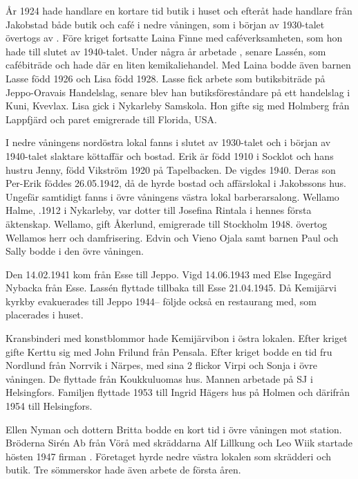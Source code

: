 År 1924 hade handlare  en kortare tid butik i huset och efteråt hade handlare  från Jakobstad både butik och café i nedre våningen, som i början av 1930-talet övertogs av . Före kriget fortsatte {Laina Finne} med caféverksamheten, som hon hade till slutet av 1940-talet. Under några år arbetade , senare Lassén, som cafébiträde och hade där en liten kemikaliehandel. Med Laina bodde även barnen Lasse född 1926 och Lisa född 1928. Lasse fick arbete som butiksbiträde på Jeppo-Oravais Handelslag, senare blev han butiksföreståndare på ett handelslag i Kuni, Kvevlax.  Lisa gick i Nykarleby Samskola. Hon gifte sig med Holmberg från Lappfjärd och paret emigrerade till Florida, USA.


I nedre våningens nordöstra lokal fanns i slutet av 1930-talet och i början av 1940-talet slaktare  köttaffär och bostad. Erik är född 1910 i Socklot och hans hustru Jenny, född Vikström 1920 på Tapelbacken. De vigdes 1940. Deras son Per-Erik föddes 26.05.1942, då de hyrde bostad och affärslokal i Jakobssons hus. Ungefär samtidigt fanns i övre våningens västra lokal  barberarsalong. Wellamo Halme, .1912 i Nykarleby, var dotter till Josefina Rintala i hennes första äktenskap. Wellamo, gift Åkerlund, emigrerade till Stockholm 1948.  övertog Wellamos herr och damfrisering. Edvin och Vieno Ojala samt barnen Paul och Sally bodde i den övre våningen.

Den 14.02.1941 kom  från Esse till Jeppo. Vigd 14.06.1943 med Else Ingegärd Nybacka från Esse. Lassén flyttade tillbaka till Esse 21.04.1945. Då Kemijärvi kyrkby evakuerades till Jeppo 1944-- följde också en restaurang  med, som placerades i huset.

Kransbinderi med konstblommor hade Kemijärvibon  i östra lokalen. Efter kriget gifte Kerttu sig med John Frilund från Pensala. Efter kriget bodde en tid fru Nordlund från Norrvik i Närpes, med sina 2 flickor Virpi och Sonja i övre våningen. De flyttade från Koukkuluomas hus. Mannen arbetade på SJ i Helsingfors. Familjen flyttade 1953 till Ingrid Hägers hus på Holmen och därifrån 1954 till Helsingfors.

Ellen Nyman och dottern Britta bodde en kort tid i övre våningen mot station. Bröderna Sirén Ab från Vörå med skräddarna Alf Lillkung och Leo Wiik startade hösten 1947 firman . Företaget hyrde nedre västra lokalen som skrädderi och butik. Tre sömmerskor hade även arbete de första åren.

